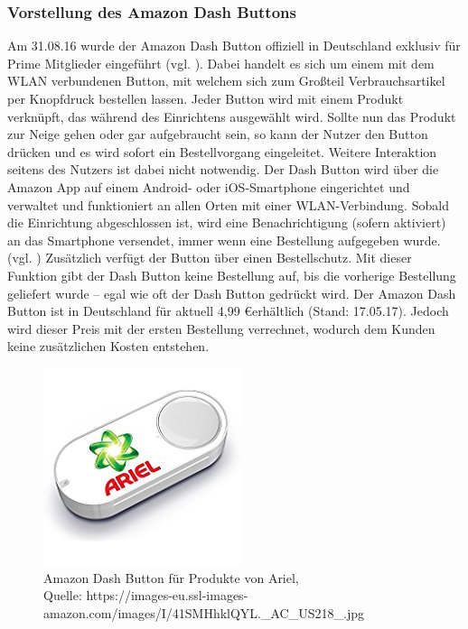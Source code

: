 \subsubsection{Vorstellung des Amazon Dash Buttons}        
\label{sec:Vorstellung des Amazon Dash Buttons} 
Am 31.08.16 wurde der Amazon Dash Button offiziell in Deutschland exklusiv für Prime Mitglieder eingeführt (vgl. \cite{ONLINE.31.08.2016}).
Dabei handelt es sich um einem mit dem WLAN verbundenen Button, mit welchem sich zum Großteil Verbrauchsartikel per Knopfdruck bestellen lassen.
Jeder Button wird mit einem Produkt verknüpft, das während des Einrichtens ausgewählt wird.
Sollte nun das Produkt zur Neige gehen oder gar aufgebraucht sein, so kann der Nutzer den Button drücken und es wird sofort ein Bestellvorgang eingeleitet.
Weitere Interaktion seitens des Nutzers ist dabei nicht notwendig.
Der Dash Button wird über die Amazon App auf einem Android- oder iOS-Smartphone eingerichtet und verwaltet und funktioniert an allen Orten mit einer WLAN-Verbindung.
Sobald die Einrichtung abgeschlossen ist, wird eine Benachrichtigung (sofern aktiviert) an das Smartphone versendet, immer wenn eine Bestellung aufgegeben wurde. (vgl. \cite{.dash})
Zusätzlich verfügt der Button über einen Bestellschutz.
Mit dieser Funktion gibt der Dash Button keine Bestellung auf, bis die vorherige Bestellung geliefert wurde – egal wie oft der Dash Button gedrückt wird.
Der Amazon Dash Button ist in Deutschland für aktuell 4,99 \euro erhältlich (Stand: 17.05.17).
Jedoch wird dieser Preis mit der ersten Bestellung verrechnet, wodurch dem Kunden keine zusätzlichen Kosten entstehen.

\begin{figure}[!htb]
	\centering
	\includegraphics[scale=0.5]{Dash.jpg}
	\caption[Amazon Dash Button für Produkte von Ariel]{Amazon Dash Button für Produkte von Ariel,\\ Quelle: https://images-eu.ssl-images-amazon.com/images/I/41SMHhklQYL.\_AC\_US218\_.jpg}
\end{figure}

